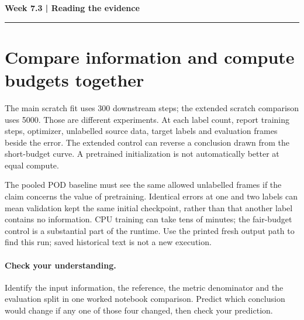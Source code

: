 \documentclass[11pt]{article}
\begin{document}
\noindent\textbf{Week 7.3 | Reading the evidence}\par\medskip\hrule\medskip
\section*{Compare information and compute budgets together}
The main scratch fit uses 300 downstream steps; the extended scratch comparison
uses 5000. Those are different experiments. At each label count, report training
steps, optimizer, unlabelled source data, target labels and evaluation frames
beside the error. The extended control can reverse a conclusion drawn from the
short-budget curve. A pretrained initialization is not automatically better at
equal compute.

The pooled POD baseline must see the same allowed unlabelled frames if the claim
concerns the value of pretraining. Identical errors at one and two labels can
mean validation kept the same initial checkpoint, rather than that another label
contains no information. CPU training can take tens of minutes; the fair-budget
control is a substantial part of the runtime. Use the printed fresh output path
to find this run; saved historical text is not a new execution.
\paragraph{Check your understanding.}
Identify the input information, the reference, the metric denominator and the
evaluation split in one worked notebook comparison. Predict which conclusion
would change if any one of those four changed, then check your prediction.
\end{document}
